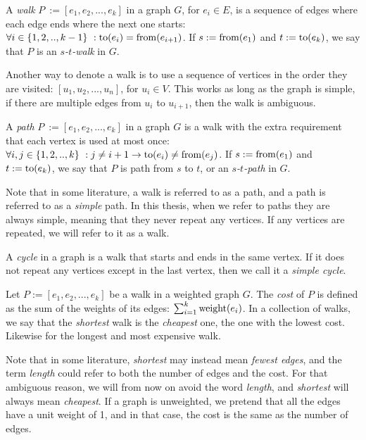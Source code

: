 \begin{definition}[Walk]
    A \emph{walk} $P~:= [e_1, e_2, ..., e_k]$ in a graph $G$, for $e_i \in E$, is a sequence of edges where each edge ends where the next one starts: $\forall i \in \{1,2,..,k-1\}~: \operatorname{to}(e_i) = \operatorname{from}(e_{i+1})$.
    If $s := \operatorname{from}(e_1)$ and $t := \operatorname{to}(e_k)$, we say that $P$ is an \emph{$s$-$t$-walk} in $G$.
\end{definition}

Another way to denote a walk is to use a sequence of vertices in the order they are visited: $[u_1, u_2, ..., u_n]$, for $u_i \in V$. This works as long as the graph is simple, if there are multiple edges from $u_i$ to $u_{i+1}$, then the walk is ambiguous.

\begin{definition}[Path]
    A \emph{path} $P~:= [e_1, e_2, ..., e_k]$ in a graph $G$ is a walk with the extra requirement that each vertex is used at most once: $\forall i, j \in \{1,2,..,k\}~: j \neq {i+1} \rightarrow \operatorname{to}(e_i) \neq \operatorname{from}(e_j)$.
    If $s := \operatorname{from}(e_1)$ and $t := \operatorname{to}(e_k)$, we say that $P$ is path from $s$ to $t$, or an \emph{$s$-$t$-path} in $G$.
\end{definition}

Note that in some literature, a walk is referred to as a path, and a path is referred to as a \emph{simple} path. In this thesis, when we refer to paths they are always simple, meaning that they never repeat any vertices. If any vertices are repeated, we will refer to it as a walk.    

\begin{definition}[Cycle]
    A \emph{cycle} in a graph is a walk that starts and ends in the same vertex. If it does not repeat any vertices except in the last vertex, then we call it a \emph{simple cycle}.
\end{definition}

\begin{definition}
    Let $P := [e_1, e_2, ..., e_k]$ be a walk in a weighted graph $G$. The \emph{cost} of $P$ is defined as the sum of the weights of its edges: $\sum_{i=1}^k \operatorname{weight}(e_i)$. In a collection of walks, we say that the \emph{shortest} walk is the \emph{cheapest} one, the one with the lowest cost. Likewise for the longest and most expensive walk. 
\end{definition}

Note that in some literature, \emph{shortest} may instead mean \emph{fewest edges}, and the term \emph{length} could refer to both the number of edges and the cost. For that ambiguous reason, we will from now on avoid the word \emph{length}, and \emph{shortest} will always mean \emph{cheapest}. If a graph is unweighted, we pretend that all the edges have a unit weight of 1, and in that case, the cost is the same as the number of edges.

